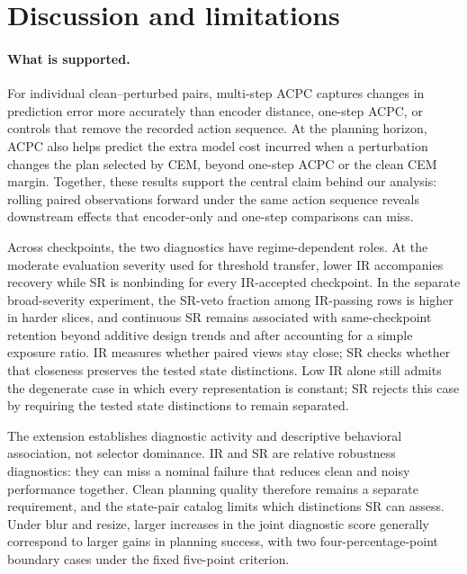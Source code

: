 \documentclass[10pt]{article}
\begin{document}
\section{Discussion and limitations}\label{sec:disc}

\paragraph{What is supported.}
For individual clean--perturbed pairs, multi-step ACPC captures changes in
prediction error more accurately than encoder distance, one-step ACPC, or
controls that remove the recorded action sequence. At the planning horizon,
ACPC also helps predict the extra model cost incurred when a perturbation
changes the plan selected by CEM, beyond one-step ACPC or the clean CEM
margin. Together, these results support the central claim behind our analysis:
rolling paired observations forward under the same action sequence reveals
downstream effects that encoder-only and one-step comparisons can miss.

Across checkpoints, the two diagnostics have regime-dependent roles. At the
moderate evaluation severity used for threshold transfer, lower IR accompanies
recovery while SR is nonbinding for every IR-accepted checkpoint. In the
separate broad-severity experiment, the SR-veto fraction among IR-passing rows
is higher in harder slices, and continuous SR remains associated with
same-checkpoint retention beyond additive design trends and after
accounting for a simple exposure ratio. IR measures whether paired views stay
close; SR checks whether that closeness preserves the tested state distinctions.
Low IR alone still admits the degenerate case in which every representation is
constant; SR rejects this case by requiring the tested state distinctions to
remain separated.

The extension establishes diagnostic activity and descriptive behavioral
association, not selector dominance. IR and SR are relative robustness
diagnostics: they can miss a nominal failure that reduces clean and noisy
performance together. Clean planning quality therefore remains a separate
requirement, and the state-pair catalog limits which distinctions SR can
assess. Under blur and resize, larger increases in the joint diagnostic score
generally correspond to larger gains in planning success, with two
four-percentage-point boundary cases under the fixed five-point criterion.
\end{document}
